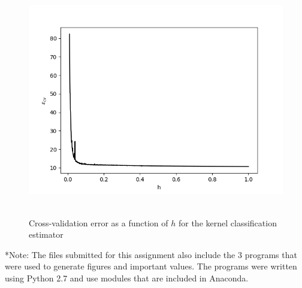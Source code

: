 \begin{figure}[h!]
    \centering
    \includegraphics[height=4in]{Figure_11.png}
    \caption{Cross-validation error as a function of $h$ for the kernel classification estimator}
\end{figure}

*Note: The files submitted for this assignment also include the 3 programs that were used to generate figures and important values. The programs were written using Python 2.7 and use modules that are included in Anaconda.